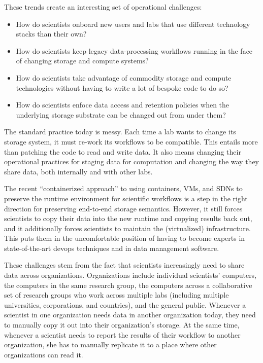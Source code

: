 These trends create an interesting set of operational challenges:

\begin{itemize}
   \item How do scientists onboard new users and labs that use different
      technology stacks than their own?
   \item How do scientists keep legacy data-processing workflows running in the face
      of changing storage and compute systems?
   \item How do scientists take advantage of commodity storage and
      compute technologies without having to write a lot of bespoke code
      to do so?
   \item How do scientists enfoce data access and retention policies when the
      underlying storage substrate can be changed out from under them?
\end{itemize}

The standard practice today is messy.  Each time a lab wants to change its
storage system, it must re-work its workflows to be compatible.  This entails
more than patching the code to read and write data.  It also means changing their
operational practices for staging data for computation and changing the way they
share data, both internally and with other labs.

The recent ``containerized approach'' to using containers, VMs, and
SDNs to preserve the runtime environment for scientific workflows
is a step in the right direction for preserving end-to-end storage semantics.
However, it still forces scientists to copy their data into the new
runtime and copying results back out, and it additionally forces scientists to
maintain the (virtualized) infrastructure.  This puts them in the uncomfortable
position of having to become experts in state-of-the-art devops techniques and
in data management software.

These challenges stem from the fact that scientists increasingly need to share
data across organizations.  Organizations include individual
scientists' computers, the computers in the same research group, the computers
across a collaborative set of research groups who
work across multiple labs (including multiple universities, corporations, and
countries), and the general public.  Whenever a scientist in one organization
needs data in another organization today, they need to manually copy it out into their
organization's storage.  At the same time, whenever a scientist needs to report the results
of their workflow to another organization, she has to manually replicate it to a place
where other organizations can read it.

